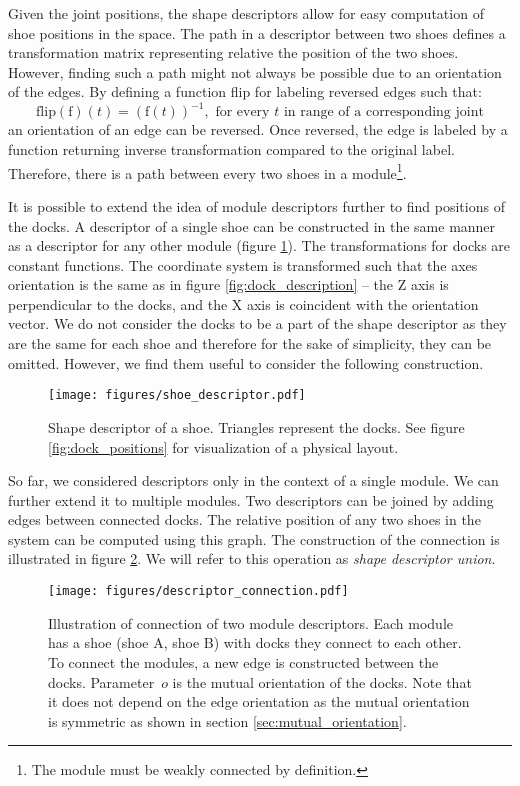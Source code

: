 Given the joint positions, the shape descriptors allow for easy computation of
shoe positions in the space. The path in a descriptor between two shoes defines
a transformation matrix representing relative the position of the two shoes.
However, finding such a path might not always be possible due to an orientation
of the edges. By defining a function flip for labeling reversed edges such that:
\[\text{flip}(\text{f})(t) = (\text{f}(t))^{-1}, \text{ for every } t \text{ in
range of a corresponding joint}\] an orientation of an edge can be reversed.
Once reversed, the edge is labeled by a function returning inverse
transformation compared to the original label. Therefore, there is a path
between every two shoes in a module\footnote{The module must be weakly
connected by definition.}.

It is possible to extend the idea of module descriptors further to find
positions of the docks. A descriptor of a single shoe can be constructed in the
same manner as a descriptor for any other module (figure
\ref{fig:shoe_descriptor}). The transformations for docks are constant
functions. The coordinate system is transformed such that the axes orientation
is the same as in figure \ref{fig:dock_description} -- the Z axis is
perpendicular to the docks, and the X axis is coincident with the orientation
vector. We do not consider the docks to be a part of the shape descriptor as
they are the same for each shoe and therefore for the sake of simplicity, they
can be omitted. However, we find them useful to consider the following
construction.

\begin{figure}[t]
    \centering
    \texttt{[image: figures/shoe\_descriptor.pdf]}
    \caption{Shape descriptor of a shoe. Triangles represent the docks. See
    figure
    \ref{fig:dock_positions} for visualization of a physical layout.}
    \label{fig:shoe_descriptor}
\end{figure}

So far, we considered descriptors only in the context of a single module. We can
further extend it to multiple modules. Two descriptors can be joined by adding
edges between connected docks. The relative position of any two shoes in the
system can be computed using this graph. The construction of the connection is
illustrated in figure \ref{fig:connection_descriptor}. We will refer to this
operation as \emph{shape descriptor union}.

\begin{figure}[t]
    \centering
    \texttt{[image: figures/descriptor\_connection.pdf]}
    \caption{Illustration of connection of two module descriptors. Each module
    has a shoe (shoe A, shoe B) with docks they connect to each other. To
    connect the modules, a new edge is constructed between the docks.
    Parameter~$o$ is the mutual orientation of the docks. Note that it does not
    depend on the edge orientation as the mutual orientation is symmetric as
    shown in section \ref{sec:mutual_orientation}. }
    \label{fig:connection_descriptor}
\end{figure}


